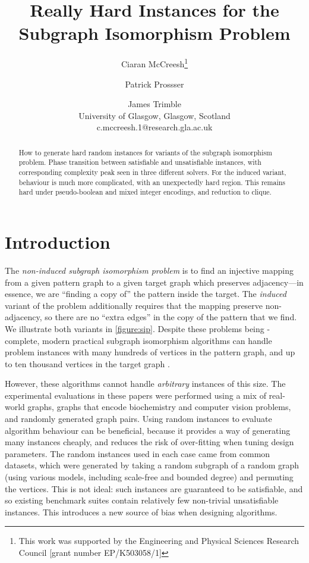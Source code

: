 \documentclass[letterpaper]{article}
\title{Really Hard Instances for the Subgraph Isomorphism Problem}
\author{Ciaran McCreesh\thanks{This work was supported by the Engineering and Physical Sciences
    Research Council [grant number EP/K503058/1]} \and Patrick Prossser \and James Trimble \\
University of Glasgow, Glasgow, Scotland \\
c.mccreesh.1@research.gla.ac.uk}
\begin{document}
\maketitle

\begin{abstract}
    How to generate hard random instances for variants of the subgraph isomorphism problem. Phase
    transition between satisfiable and unsatisfiable instances, with corresponding complexity peak
    seen in three different solvers. For the induced variant, behaviour is much more complicated,
    with an unexpectedly hard region. This remains hard under pseudo-boolean and mixed integer
    encodings, and reduction to clique.
\end{abstract}

\section{Introduction}

The \emph{non-induced subgraph isomorphism problem} is to find an injective mapping from a given
pattern graph to a given target graph which preserves adjacency---in essence, we are ``finding a
copy of'' the pattern inside the target. The \emph{induced} variant of the problem additionally
requires that the mapping preserve non-adjacency, so there are no ``extra edges'' in the copy of the
pattern that we find. We illustrate both variants in \cref{figure:sip}.
Despite these problems being \NP-complete, modern practical subgraph isomorphism algorithms can
handle problem instances with many hundreds of vertices in the pattern graph, and up to ten thousand
vertices in the target graph \citep{Cordella:2004,Solnon:2010,Audemard:2014,McCreesh:2015}.

However, these algorithms cannot handle \emph{arbitrary} instances of this size. The experimental
evaluations in these papers were performed using a mix of real-world graphs, graphs that encode
biochemistry and computer vision problems, and randomly generated graph pairs. Using random
instances to evaluate algorithm behaviour can be beneficial, because it provides a way of generating
many instances cheaply, and reduces the risk of over-fitting when tuning design parameters. The
random instances used in each case came from common datasets, which were generated by taking a
random subgraph of a random graph (using various models, including scale-free and bounded degree)
and permuting the vertices.  This is not ideal: such instances are guaranteed to be satisfiable, and
so existing benchmark suites contain relatively few non-trivial unsatisfiable instances. This
introduces a new source of bias when designing algorithms.
\end{document}
